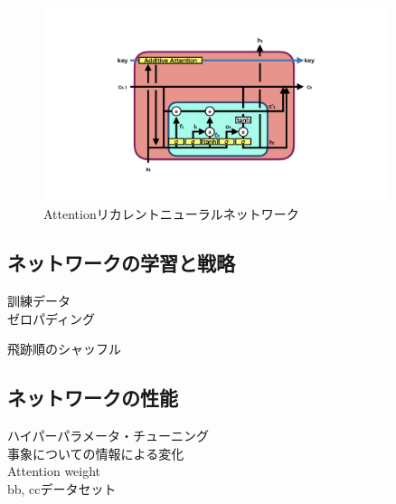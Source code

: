 \begin{figure}[h]
 \centering
 \includegraphics[trim = 100 100 0 100, width=0.9\textwidth]{Figure/3Networks/3-4-2-2AttentionVLSTM.png}
 \caption{Attentionリカレントニューラルネットワーク}
 \label{3-4-2-2AttentionVLSTM}
\end{figure}


\subsection{ネットワークの学習と戦略} \label{Net:VLSTM:TrainingandStrategyofVLSTM}

訓練データ\\
ゼロパディング

飛跡順のシャッフル

\subsection{ネットワークの性能} \label{Net:VLSTM:PerformanceofVLSTM}

ハイパーパラメータ・チューニング\\

事象についての情報による変化\\

Attention weight\\

bb, ccデータセット









